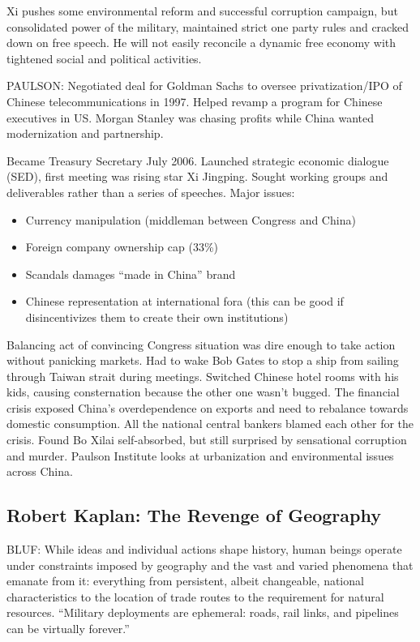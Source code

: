 \documentclass[
]{article}
\begin{document}
Xi pushes some environmental reform and successful corruption campaign,
but consolidated power of the military, maintained strict one party
rules and cracked down on free speech. He will not easily reconcile a
dynamic free economy with tightened social and political activities.

PAULSON: Negotiated deal for Goldman Sachs to oversee privatization/IPO
of Chinese telecommunications in 1997. Helped revamp a program for
Chinese executives in US. Morgan Stanley was chasing profits while China
wanted modernization and partnership.

Became Treasury Secretary July 2006. Launched strategic economic
dialogue (SED), first meeting was rising star Xi Jingping. Sought
working groups and deliverables rather than a series of speeches. Major
issues:

\begin{itemize}
\item
  Currency manipulation (middleman between Congress and China)
\item
  Foreign company ownership cap (33\%)
\item
  Scandals damages ``made in China'' brand
\item
  Chinese representation at international fora (this can be good if
  disincentivizes them to create their own institutions)
\end{itemize}

Balancing act of convincing Congress situation was dire enough to take
action without panicking markets. Had to wake Bob Gates to stop a ship
from sailing through Taiwan strait during meetings. Switched Chinese
hotel rooms with his kids, causing consternation because the other one
wasn't bugged. The financial crisis exposed China's overdependence on
exports and need to rebalance towards domestic consumption. All the
national central bankers blamed each other for the crisis. Found Bo
Xilai self-absorbed, but still surprised by sensational corruption and
murder. Paulson Institute looks at urbanization and environmental issues
across China.

\hypertarget{robert-kaplan-the-revenge-of-geography}{%
\subsection{Robert Kaplan: The Revenge of
Geography}\label{robert-kaplan-the-revenge-of-geography}}

BLUF: While ideas and individual actions shape history, human beings
operate under constraints imposed by geography and the vast and varied
phenomena that emanate from it: everything from persistent, albeit
changeable, national characteristics to the location of trade routes to
the requirement for natural resources. ``Military deployments are
ephemeral: roads, rail links, and pipelines can be virtually forever.''
\end{document}
